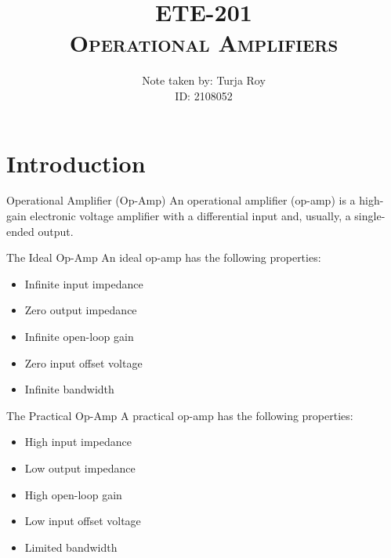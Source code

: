 \documentclass[12pt]{article}
\title{
    \textbf{ETE-201} \\
    \textsc{Operational Amplifiers}
}
\author{
    Note taken by: Turja Roy \\ 
    ID: 2108052
}
\date{}
\begin{document}
\maketitle

\tableofcontents

\newpage
\section{Introduction}
\begin{definition}{Operational Amplifier (Op-Amp)}{}
    An operational amplifier (op-amp) is a high-gain electronic voltage amplifier with a differential input and, usually, a single-ended output.
\end{definition}

\begin{definition}{The Ideal Op-Amp}{}
    An ideal op-amp has the following properties:
    \begin{itemize}[itemsep=0pt]
        \item Infinite input impedance
        \item Zero output impedance
        \item Infinite open-loop gain
        \item Zero input offset voltage
        \item Infinite bandwidth
    \end{itemize}
\end{definition}

\begin{definition}{The Practical Op-Amp}{}
    A practical op-amp has the following properties:
    \begin{itemize}[itemsep=0pt]
        \item High input impedance
        \item Low output impedance
        \item High open-loop gain
        \item Low input offset voltage
        \item Limited bandwidth
    \end{itemize}
\end{definition}\vspace{10pt}

\begin{figure}[htpb]
    \centering
    \begin{tikzpicture}
        
    \end{tikzpicture}
    \caption{}
\end{figure}
\end{document}
